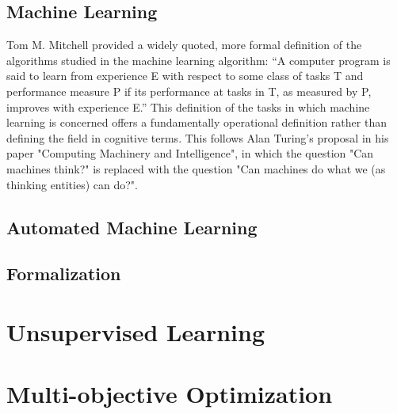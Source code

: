\documentclass[a4paper,12pt,times,numbered,print,index]{Classes/PhDThesisPSnPDF}
\begin{document}
\section{Machine Learning}\label{automl-background-sec:ml}
Tom M. Mitchell provided a widely quoted, more formal definition of the algorithms studied in the machine learning algorithm: ``A computer program is said to learn from experience E with respect to some class of tasks T and performance measure P if its performance at tasks in T, as measured by P, improves with experience E.''
This definition of the tasks in which machine learning is concerned offers a fundamentally operational definition rather than defining the field in cognitive terms.
This follows Alan Turing's proposal in his paper "Computing Machinery and Intelligence", in which the question "Can machines think?" is replaced with the question "Can machines do what we (as thinking entities) can do?".

\section{Automated Machine Learning}\label{automl-background-sec:automl}

\section{Formalization}\label{automl-background-sec:formalization}


% 

% 
% 
% 


\chapter{Unsupervised Learning}
\label{automl-chap:unsupervised}

\chapter{Multi-objective Optimization}
\label{automl-chap:moo}
\end{document}
